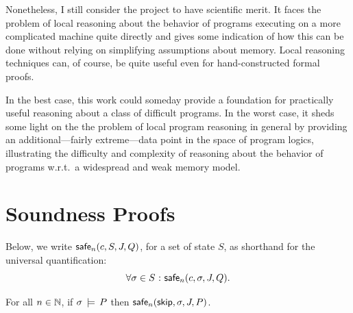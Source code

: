 \documentclass[11pt]{article}
\begin{document}
Nonetheless, I still consider the project to have scientific merit. It faces the problem of local reasoning about the behavior of programs executing on a more complicated machine quite directly and gives some indication of how this can be done without relying on simplifying assumptions about memory. Local reasoning techniques can, of course, be quite useful even for hand-constructed formal proofs. 

In the best case, this work could someday provide a foundation for practically useful reasoning about a class of difficult programs. In the worst case, it sheds some light on the the problem of local program reasoning in general by providing an additional---fairly extreme---data point in the space of program logics, illustrating the difficulty and complexity of reasoning about the behavior of programs w.r.t.~a widespread and weak memory model. 



 

\appendix

\section{Soundness Proofs}
\label{sec:soundness-proofs}
Below, we write $\mathsf{safe}_{n}(c,S,J,Q)$, for a set of state $S$, as shorthand for the universal quantification: \[ \forall \sigma \in S \operatorname{\,:\,} \mathsf{safe}_{n}(c,\sigma,J,Q).\]

\begin{lemma}
	\label{lem:skip-safe}
	For all $n \in \mathbb{N}$, if $\sigma \,\models\, P$ then $\mathsf{safe}_{n}(\operatorname{\mathsf{skip}},\sigma,J,P)$. 
\end{lemma}
\end{document}
